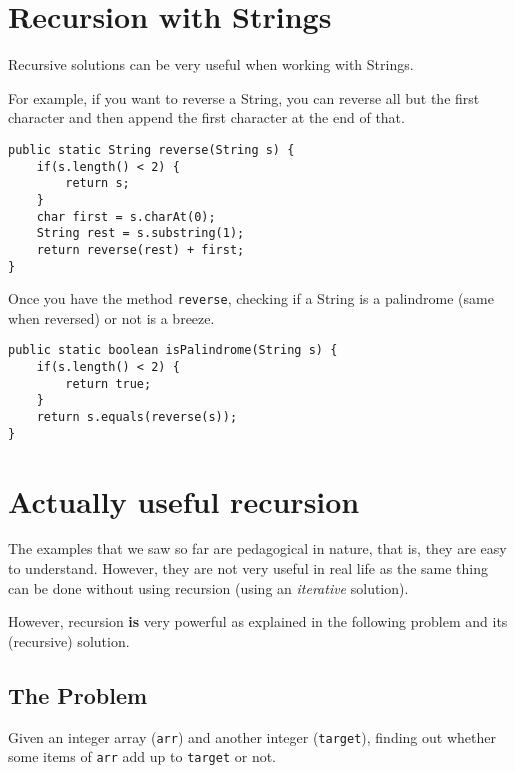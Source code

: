 \section{Recursion with Strings}

Recursive solutions can be very useful when working with Strings.

For example, if you want to reverse a String, you can reverse all but the first character and then append the first character at the end of that.

\begin{lstlisting}
public static String reverse(String s) {
	if(s.length() < 2) {
		return s;
	}
	char first = s.charAt(0);
	String rest = s.substring(1);
	return reverse(rest) + first;
}
\end{lstlisting}

Once you have the method \texttt{reverse}, checking if a String is a palindrome (same when reversed) or not is a breeze.

\begin{lstlisting}
public static boolean isPalindrome(String s) {
	if(s.length() < 2) {
		return true;
	}
	return s.equals(reverse(s));
}
\end{lstlisting}
\section{Actually useful recursion}

The examples that we saw so far are pedagogical in nature, that is, they are easy to understand. However, they are not very useful in real life as the same thing can be done without using recursion (using an \textit{iterative} solution).

However, recursion \textbf{is} very powerful as explained in the following problem and its (recursive) solution.


\subsection{The Problem}

Given an integer array (\texttt{arr}) and another integer (\texttt{target}), finding out whether some items of \texttt{arr} add up to \texttt{target} or not.

